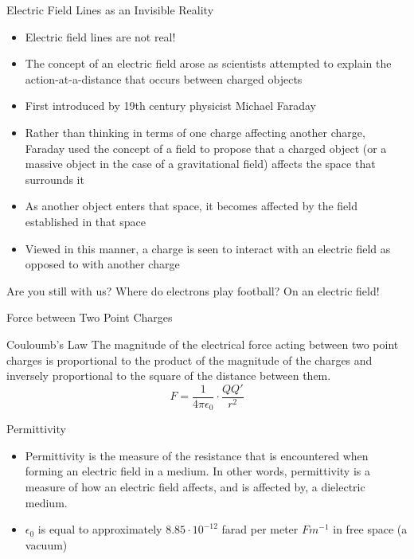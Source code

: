 \documentclass{beamer}
\begin{document}
	
\begin{frame}{Electric Field Lines as an Invisible Reality}{}
  \begin{itemize}
    \item Electric field lines are not real!
	\item The concept of an electric field arose as scientists attempted to explain the action-at-a-distance that occurs between charged objects
	\item First introduced by 19th century physicist Michael Faraday
	\item Rather than thinking in terms of one charge affecting another charge, Faraday used the concept of a field to propose that a charged object (or a massive object in the case of a gravitational field) affects the space that surrounds it
	\item  As another object enters that space, it becomes affected by the field established in that space
	\item Viewed in this manner, a charge is seen to interact with an electric field as opposed to with another charge
  \end{itemize}
\end{frame}

\begin{frame}{Are you still with us?}
Where do electrons play football? On an electric field!
\end{frame}

\begin{frame}{Force between Two Point Charges}
  \begin{block}{Couloumb's Law}
The magnitude of the electrical force acting between two point charges is proportional to the product of the magnitude of the charges and inversely proportional to the square of the distance between them.
\[F=\frac{1}{4\pi \epsilon_0} \cdot \frac{QQ\prime}{r^2} \]
  \end{block}
\end{frame}

\begin{frame}{Permittivity}{}
  \begin{itemize}
  \item Permittivity is the measure of the resistance that is encountered when forming an electric field in a medium. In other words, permittivity is a measure of how an electric field affects, and is affected by, a dielectric medium.
  \item \(\epsilon_0\) is equal to approximately \(8.85 \cdot 10^{-12}\) farad per meter \(Fm^{-1}\) in free space (a vacuum)
  \end{itemize}
\end{frame}
\end{document}
